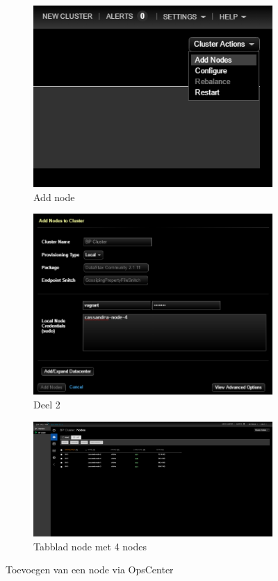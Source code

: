 \begin{figure}[H]
	\centering
	\begin{subfigure}{.49\textwidth}
		\centering
		\includegraphics[width=.9\linewidth]{img/4_installatie_cassandra/4_Add_Node_1}
		\caption{Add node}
		\label{fig:cas_add_node_1}
	\end{subfigure}
	\begin{subfigure}{.49\textwidth}
		\centering
		\includegraphics[width=.9\linewidth]{img/4_installatie_cassandra/4_Add_Node_2}
		\caption{Deel 2}
		\label{fig:cas_add_node_2}
	\end{subfigure}
	\begin{subfigure}{\textwidth}
		\centering
		\includegraphics[width=.9\linewidth]{img/4_installatie_cassandra/4_Add_Node_7a}
		\caption{Tabblad node met 4 nodes}
		\label{fig:cas_add_node_3}
	\end{subfigure}
	\caption{Toevoegen van een node via OpsCenter}
	\label{fig:cas_add_node}
\end{figure}

